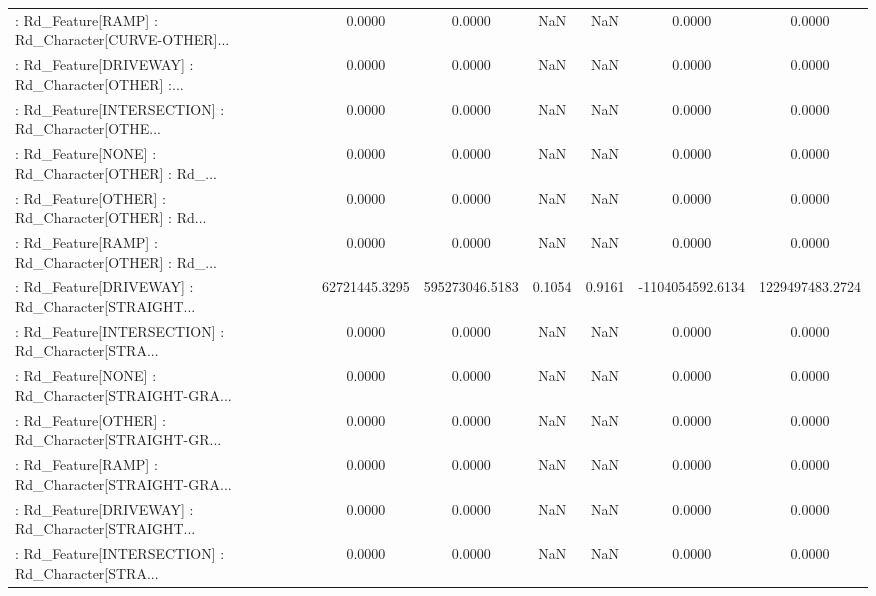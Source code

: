 \begin{longtable}{p{4cm}cccccc}
 : Rd\_Feature[RAMP] : Rd\_Character[CURVE-OTHER]... &            0.0000 &            0.0000 &     NaN &          NaN &             0.0000 &            0.0000 \\
 : Rd\_Feature[DRIVEWAY] : Rd\_Character[OTHER] :... &            0.0000 &            0.0000 &     NaN &          NaN &             0.0000 &            0.0000 \\
 : Rd\_Feature[INTERSECTION] : Rd\_Character[OTHE... &            0.0000 &            0.0000 &     NaN &          NaN &             0.0000 &            0.0000 \\
 : Rd\_Feature[NONE] : Rd\_Character[OTHER] : Rd\_... &            0.0000 &            0.0000 &     NaN &          NaN &             0.0000 &            0.0000 \\
 : Rd\_Feature[OTHER] : Rd\_Character[OTHER] : Rd... &            0.0000 &            0.0000 &     NaN &          NaN &             0.0000 &            0.0000 \\
 : Rd\_Feature[RAMP] : Rd\_Character[OTHER] : Rd\_... &            0.0000 &            0.0000 &     NaN &          NaN &             0.0000 &            0.0000 \\
 : Rd\_Feature[DRIVEWAY] : Rd\_Character[STRAIGHT... &     62721445.3295 &    595273046.5183 &  0.1054 &       0.9161 &   -1104054592.6134 &   1229497483.2724 \\
 : Rd\_Feature[INTERSECTION] : Rd\_Character[STRA... &            0.0000 &            0.0000 &     NaN &          NaN &             0.0000 &            0.0000 \\
 : Rd\_Feature[NONE] : Rd\_Character[STRAIGHT-GRA... &            0.0000 &            0.0000 &     NaN &          NaN &             0.0000 &            0.0000 \\
 : Rd\_Feature[OTHER] : Rd\_Character[STRAIGHT-GR... &            0.0000 &            0.0000 &     NaN &          NaN &             0.0000 &            0.0000 \\
 : Rd\_Feature[RAMP] : Rd\_Character[STRAIGHT-GRA... &            0.0000 &            0.0000 &     NaN &          NaN &             0.0000 &            0.0000 \\
 : Rd\_Feature[DRIVEWAY] : Rd\_Character[STRAIGHT... &            0.0000 &            0.0000 &     NaN &          NaN &             0.0000 &            0.0000 \\
 : Rd\_Feature[INTERSECTION] : Rd\_Character[STRA... &            0.0000 &            0.0000 &     NaN &          NaN &             0.0000 &            0.0000 \\

\end{longtable}
